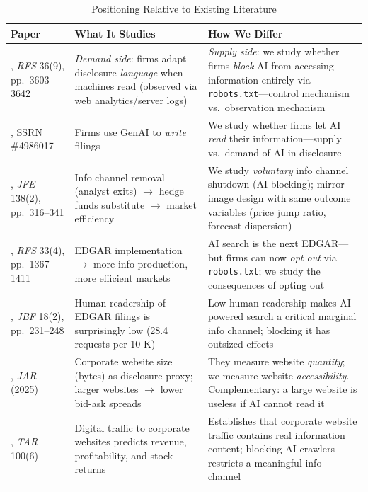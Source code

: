 \documentclass[12pt,a4paper]{article}
\begin{document}
\begin{table}[htbp]
\centering
\caption{Positioning Relative to Existing Literature}
\label{tab:positioning}
\small
\begin{tabularx}{\textwidth}{p{3.8cm}p{3.2cm}X}
\toprule
\textbf{Paper} & \textbf{What It Studies} & \textbf{How We Differ} \\
\midrule
\citet{CaoJiangYangZhang2023}, \emph{RFS} 36(9), pp.\ 3603--3642 & \emph{Demand side}: firms adapt disclosure \emph{language} when machines read (observed via web analytics/server logs) & \emph{Supply side}: we study whether firms \emph{block} AI from accessing information entirely via \texttt{robots.txt}---control mechanism vs.\ observation mechanism \\
\addlinespace
\citet{BlankespoorDeHaanLi2024}, SSRN \#4986017 & Firms use GenAI to \emph{write} filings & We study whether firms let AI \emph{read} their information---supply vs.\ demand of AI in disclosure \\
\addlinespace
\citet{ChenKellyWu2020}, \emph{JFE} 138(2), pp.\ 316--341 & Info channel removal (analyst exits) $\to$ hedge funds substitute $\to$ market efficiency & We study \emph{voluntary} info channel shutdown (AI blocking); mirror-image design with same outcome variables (price jump ratio, forecast dispersion) \\
\addlinespace
\citet{GaoHuang2020}, \emph{RFS} 33(4), pp.\ 1367--1411 & EDGAR implementation $\to$ more info production, more efficient markets & AI search is the next EDGAR---but firms can now \emph{opt out} via \texttt{robots.txt}; we study the consequences of opting out \\
\addlinespace
\citet{LoughranMcDonald2017}, \emph{JBF} 18(2), pp.\ 231--248 & Human readership of EDGAR filings is surprisingly low (28.4 requests per 10-K) & Low human readership makes AI-powered search a critical marginal info channel; blocking it has outsized effects \\
\addlinespace
\citet{BoullandBourveauBreuer2025}, \emph{JAR} (2025) & Corporate website size (bytes) as disclosure proxy; larger websites $\to$ lower bid-ask spreads & They measure website \emph{quantity}; we measure website \emph{accessibility}. Complementary: a large website is useless if AI cannot read it \\
\addlinespace
\citet{ArmstrongKonchitchkiZhang2025}, \emph{TAR} 100(6) & Digital traffic to corporate websites predicts revenue, profitability, and stock returns & Establishes that corporate website traffic contains real information content; blocking AI crawlers restricts a meaningful info channel \\

\end{tabularx}
\end{table}
\end{document}
